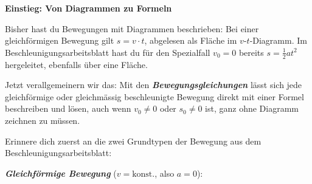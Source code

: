 \documentclass[addpoints,11pt,a4paper]{exam}
\newenvironment{beispielbox}[1][Beispiel]{%
  \par\addvspace{10pt}\noindent\textbf{#1}\par\smallskip\noindent
}{%
  \par\addvspace{10pt}
}
\begin{document}
\begin{beispielbox}[Einstieg: Von Diagrammen zu Formeln]
Bisher hast du Bewegungen mit Diagrammen beschrieben: Bei einer
gleichförmigen Bewegung gilt $s=v\cdot t$, abgelesen als Fläche im
$v$-$t$-Diagramm. Im Beschleunigungsarbeitsblatt hast du für den
Spezialfall $v_0=0$ bereits $s=\tfrac12at^2$ hergeleitet, ebenfalls über
eine Fläche.

Jetzt verallgemeinern wir das: Mit den \textbf{\emph{Bewegungsgleichungen}}
lässt sich jede gleichförmige oder gleichmässig beschleunigte Bewegung
direkt mit einer Formel beschreiben und lösen, auch wenn $v_0\neq0$ oder
$s_0\neq0$ ist, ganz ohne Diagramm zeichnen zu müssen.

Erinnere dich zuerst an die zwei Grundtypen der Bewegung aus dem
Beschleunigungsarbeitsblatt:

\textbf{\emph{Gleichförmige Bewegung}} ($v=\text{konst.}$, also $a=0$):


\end{beispielbox}
\end{document}
